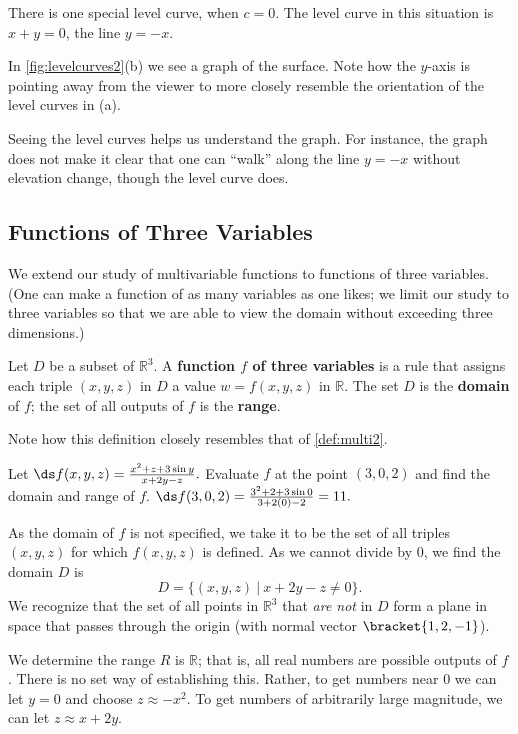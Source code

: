\begin{example}
There is one special level curve, when $c=0$. The level curve in this situation is $x+y=0$, the line $y=-x$.

In \autoref{fig:levelcurves2}(b) we see a graph of the surface. Note how the $y$-axis is pointing away from the viewer to more closely resemble the orientation of the level curves in (a). 

Seeing the level curves helps us understand the graph. For instance, the graph does not make it clear that one can ``walk'' along the line $y=-x$ without elevation change, though the level curve does.
\end{example}

\subsection{Functions of Three Variables}

We extend our study of multivariable functions to functions of three variables. (One can make a function of as many variables as one likes; we limit our study to three variables so that we are able to view the domain without exceeding three dimensions.)

\begin{definition}\label{def:multi3}
Let $D$ be a subset of $\mathbb{R}^3$. A \textbf{function $f$ of three variables} is a rule that assigns each triple $(x,y,z)$ in $D$ a value $w=f(x,y,z)$ in $\mathbb{R}$. The set $D$ is the \textbf{domain} of $f$; the set of all outputs of $f$ is the \textbf{range}.
\end{definition}

Note how this definition closely resembles that of \autoref{def:multi2}.

\begin{example}\label{ex_multi3}
Let $\ds f(x,y,z) =  \frac{x^2+z+3\sin y}{x+2y-z}.$ Evaluate $f$ at the point $(3,0,2)$ and find the domain and range of $f$.
\solution
$\ds f(3,0,2) = \frac{3^2+2+3\sin 0}{3+2(0)-2} = 11.$

As the domain of $f$ is not specified, we take it to be the set of all triples $(x,y,z)$ for which $f(x,y,z)$ is defined. As we cannot divide by $0$, we find the domain $D$ is 
\[D = \{(x,y,z)\ |\ x+2y-z\neq 0\}.\]
We recognize that the set of all points in $\mathbb{R}^3$ that \emph{are not} in $D$ form a plane in space that passes through the origin (with normal vector $\bracket{1,2,-1}$). 

We determine the range $R$ is $\mathbb{R}$; that is, all real numbers are possible outputs of $f$. There is no set way of establishing this. Rather, to get numbers near 0 we can let $y=0$ and choose $z \approx -x^2$. To get numbers of arbitrarily large magnitude, we can let $z\approx x+2y$.
\end{example}

